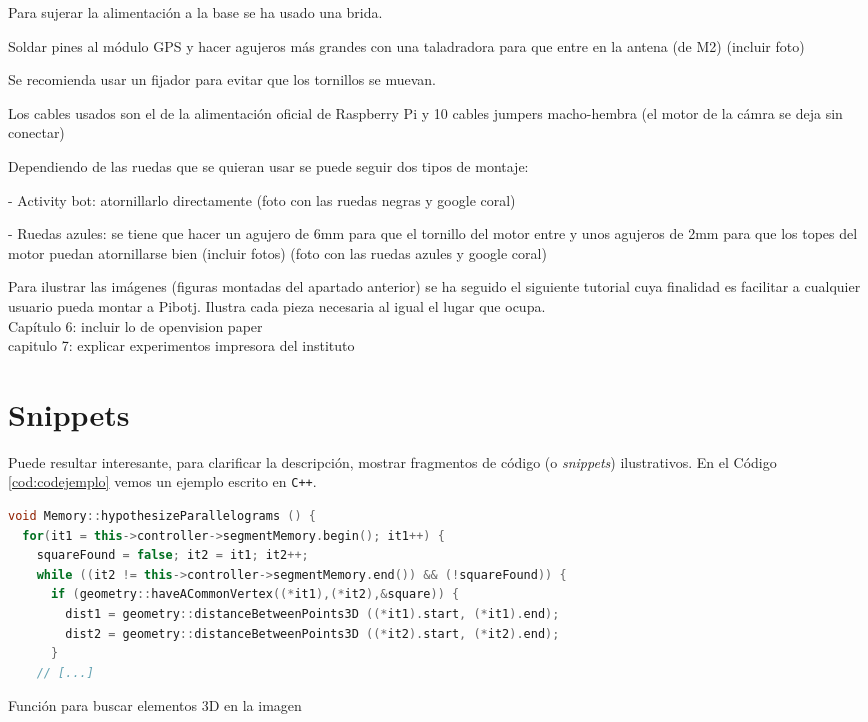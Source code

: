 Para sujerar la alimentación a la base se ha usado una brida. 

Soldar pines al módulo GPS y hacer agujeros más grandes con una taladradora para que entre en la antena (de M2) (incluir foto)

Se recomienda usar un fijador para evitar que los tornillos se muevan.

Los cables usados son el de la alimentación oficial de Raspberry Pi y 10 cables jumpers macho-hembra (el motor de la cámra se deja sin conectar)

Dependiendo de las ruedas que se quieran usar se puede seguir dos tipos de montaje: 

- Activity bot: atornillarlo directamente (foto con las ruedas negras y google coral)

- Ruedas azules: se tiene que hacer un agujero de 6mm para que el tornillo del motor entre y unos agujeros de 2mm para que los topes del motor puedan atornillarse bien (incluir fotos)   (foto con las ruedas azules y google coral)



Para ilustrar las imágenes  (figuras montadas del apartado anterior) se ha seguido el siguiente tutorial cuya finalidad es facilitar a cualquier usuario pueda montar a Pibotj. Ilustra cada pieza necesaria al igual el lugar que ocupa.\\
 
Capítulo 6: incluir lo de openvision paper\\
capitulo 7: explicar experimentos impresora del instituto \\

\section{Snippets}

Puede resultar interesante, para clarificar la descripción, mostrar fragmentos de código (o \textit{snippets}) ilustrativos. En el Código \ref{cod:codejemplo} vemos un ejemplo escrito en \texttt{C++}.

\begin{code}[h]
\begin{lstlisting}[language=C++]
void Memory::hypothesizeParallelograms () {
  for(it1 = this->controller->segmentMemory.begin(); it1++) {
    squareFound = false; it2 = it1; it2++;
    while ((it2 != this->controller->segmentMemory.end()) && (!squareFound)) {
      if (geometry::haveACommonVertex((*it1),(*it2),&square)) {
        dist1 = geometry::distanceBetweenPoints3D ((*it1).start, (*it1).end);
        dist2 = geometry::distanceBetweenPoints3D ((*it2).start, (*it2).end);
      }
    // [...]
\end{lstlisting}
\caption[Función para buscar elementos 3D en la imagen]{Función para buscar elementos 3D en la imagen}
\label{cod:codejemplo}
\end{code}

